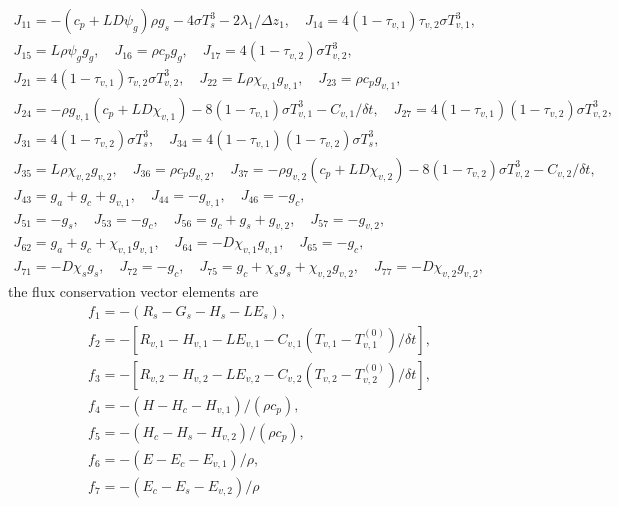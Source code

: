 \documentclass[fleqn]{article}
\begin{document}
\begin{gather}
J_{11} = -(c_p + LD\psi_g)\rho g_s - 4\sigma T_s^3 - 2\lambda_1/\Delta z_1, \quad
J_{14} = 4(1 - \tau_{v,1})\tau_{v,2}\sigma T_{v,1}^3, \nonumber \\
J_{15} = L\rho\psi_g g_g, \quad
J_{16} = \rho c_p g_g, \quad
J_{17} = 4(1 - \tau_{v,2})\sigma T_{v,2}^3, \nonumber \\
J_{21} = 4(1 - \tau_{v,1})\tau_{v,2}\sigma T_{v,2}^3, \quad
J_{22} = L\rho\chi_{v,1}g_{v,1}, \quad
J_{23} = \rho c_p g_{v,1}, \nonumber \\
J_{24} = - \rho g_{v,1}(c_p + LD\chi_{v,1}) - 8(1 - \tau_{v,1})\sigma T_{v,1}^3 - C_{v,1}/\delta t, \quad
J_{27} = 4(1 - \tau_{v,1})(1 - \tau_{v,2})\sigma T_{v,2}^3, \nonumber \\
J_{31} = 4(1 - \tau_{v,2})\sigma T_s^3, \quad
J_{34} = 4(1 - \tau_{v,1})(1 - \tau_{v,2})\sigma T_s^3, \nonumber\\
J_{35} = L\rho\chi_{v,2}g_{v,2}, \quad
J_{36} = \rho c_p g_{v,2}, \quad
J_{37} = - \rho g_{v,2}(c_p + LD\chi_{v,2}) - 8(1 - \tau_{v,2})\sigma T_{v,2}^3 - C_{v,2}/\delta t, \nonumber \\
J_{43} = g_a + g_c + g_{v,1}, \quad
J_{44} = -g_{v,1}, \quad
J_{46} = -g_c, \nonumber \\
J_{51} = -g_s, \quad
J_{53} = -g_c, \quad
J_{56} = g_c + g_s + g_{v,2}, \quad
J_{57} = -g_{v,2}, \nonumber \\
J_{62} = g_a + g_c + \chi_{v,1}g_{v,1}, \quad
J_{64} = -D\chi_{v,1}g_{v,1}, \quad
J_{65} = -g_c, \nonumber \\
J_{71} = -D\chi_s g_s, \quad
J_{72} = -g_c, \quad
J_{75} = g_c + \chi_s g_s + \chi_{v,2}g_{v,2}, \quad
J_{77} = -D\chi_{v,2}g_{v,2},
\end{gather}
the flux conservation vector elements are
\begin{gather}
f_1 = -(R_s - G_s - H_s - LE_s), \nonumber \\
f_2 = -[R_{v,1} - H_{v,1} - LE_{v,1} - C_{v,1}(T_{v,1} - T_{v,1}^{(0)})/\delta t], \nonumber \\
f_3 = -[R_{v,2} - H_{v,2} - LE_{v,2} - C_{v,2}(T_{v,2} - T_{v,2}^{(0)})/\delta t], \nonumber \\
f_4 = -(H - H_c - H_{v,1})/(\rho c_p), \nonumber \\
f_5 = -(H_c - H_s - H_{v,2})/(\rho c_p), \nonumber \\
f_6 = -(E - E_c - E_{v,1})/\rho, \nonumber \\
f_7 = -(E_c - E_s - E_{v,2})/\rho
\end{gather}  
\end{document}
